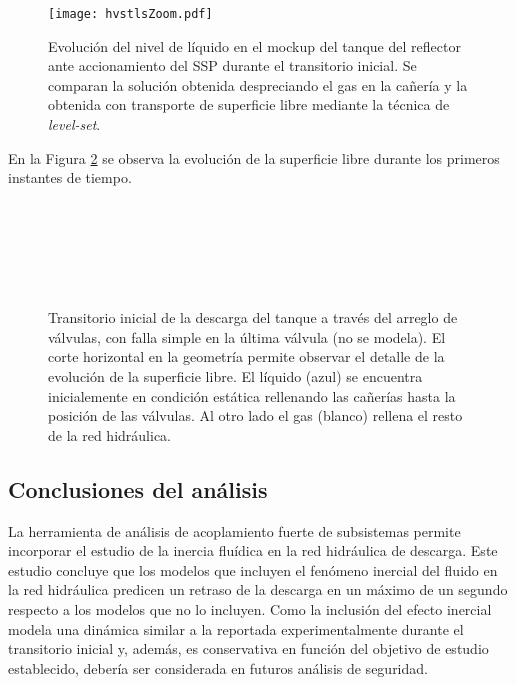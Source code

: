 \begin{figure}[ht]
\centering
\texttt{[image: hvstlsZoom.pdf]}
\caption{Evolución del nivel de líquido en el mockup del tanque del reflector ante accionamiento del SSP durante el transitorio inicial.
  Se comparan la solución obtenida despreciando el gas en la cañería y la obtenida con transporte de superficie libre mediante la técnica de \textit{level-set}.}  
	\label{hvstls}
\end{figure}

En la Figura \ref{evol-ls} se observa la evolución de la superficie libre durante los primeros instantes de tiempo.

\begin{figure}[ht]
\begin{minipage}[t]{.48\textwidth}
\centering
{}\\
\\
\end{minipage}\hfill
\begin{minipage}[t]{.48\textwidth}
\centering
{}\\
\\
\end{minipage}
\caption{Transitorio inicial de la descarga del tanque a través del arreglo de válvulas, con falla simple en la última válvula
  (no se modela).
	El corte horizontal en la geometría permite observar el detalle de la evolución de la superficie libre.
  El líquido (azul) se encuentra inicialemente en condición estática rellenando las cañerías hasta la posición de las válvulas.
  Al otro lado el gas (blanco) rellena el resto de la red hidráulica.}  
\label{evol-ls}
\end{figure}

\subsection*{Conclusiones del análisis}
La herramienta de análisis de acoplamiento fuerte de subsistemas permite incorporar el estudio de la inercia fluídica en la red hidráulica de descarga.
Este estudio concluye que los modelos que incluyen el fenómeno inercial del fluido en la red hidráulica predicen un retraso de la descarga en un máximo de un segundo 
respecto a los modelos que no lo incluyen.
Como la inclusión del efecto inercial modela una dinámica similar a la reportada experimentalmente durante el transitorio inicial y,
además, es conservativa en función del objetivo de estudio establecido, debería ser considerada en futuros análisis de seguridad.

